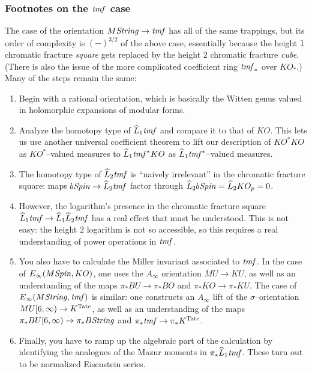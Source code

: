 \subsubsection{Footnotes on the $\mathit{tmf}$ case}

The case of the orientation $M\mathit{String} \to \mathit{tmf}$ has all of the same trappings, but its order of complexity is $(-)^{3/2}$ of the above case, essentially because the height $1$ chromatic fracture \emph{square} gets replaced by the height $2$ chromatic fracture \emph{cube}.  (There is also the issue of the more complicated coefficient ring $\mathit{tmf}_*$ over $KO_*$.)  Many of the steps remain the same:
\begin{enumerate}
    \item Begin with a rational orientation, which is basically the Witten genus valued in holomorphic expansions of modular forms.
    \item Analyze the homotopy type of $\widehat L_1 \mathit{tmf}$ and compare it to that of $KO$.  This lets us use another universal coefficient theorem to lift our description of $KO^* KO$ as $KO^*$--valued measures to $\widehat L_1 \mathit{tmf}^* KO$ as $\widehat L_1 \mathit{tmf}^*$--valued measures.
    \item The homotopy type of $\widehat L_2 \mathit{tmf}$ is ``naively irrelevant'' in the chromatic fracture square: maps $b\mathit{Spin} \to \widehat L_2 \mathit{tmf}$ factor through $\widehat L_2 b\mathit{Spin} = \widehat L_2 KO_p = 0$.
    \item However, the logarithm's presence in the chromatic fracture square $\widehat L_1 \mathit{tmf} \to \widehat L_1 \widehat L_2 \mathit{tmf}$ has a real effect that must be understood.  This is not easy: the height $2$ logarithm is not so accessible, so this requires a real understanding of power operations in $\mathit{tmf}$.
    \item You also have to calculate the Miller invariant associated to $\mathit{tmf}$.  In the case of $E_\infty(M\mathit{Spin}, KO)$, one uses the $A_\infty$ orientation $MU \to KU$, as well as an understanding of the maps $\pi_* BU \to \pi_* BO$ and $\pi_* KO \to \pi_* KU$.  The case of $E_\infty(M\mathit{String}, \mathit{tmf})$ is similar: one constructs an $A_\infty$ lift of the $\sigma$--orientation $MU[6, \infty) \to K^{\mathrm{Tate}}$, as well as an understanding of the maps $\pi_* BU[6, \infty) \to \pi_* B\mathit{String}$ and $\pi_* \mathit{tmf} \to \pi_* K^{\mathrm{Tate}}$.
    \item Finally, you have to ramp up the algebraic part of the calculation by identifying the analogues of the Mazur moments in $\pi_* \widehat L_1 \mathit{tmf}$.  These turn out to be normalized Eisenstein series.
\end{enumerate}

